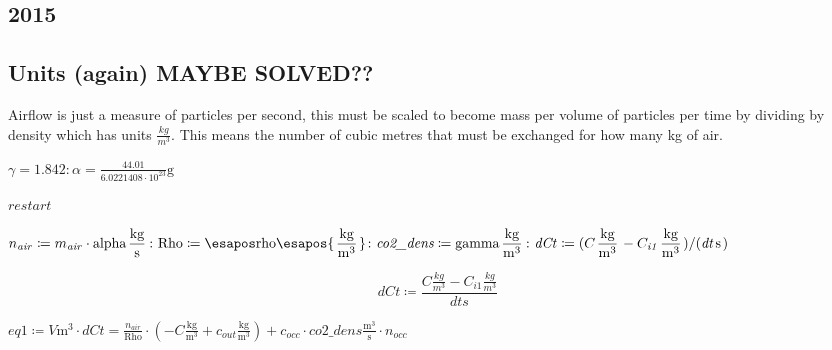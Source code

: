\documentclass{article}
\begin{document}
\subsection{\textbf{2015}}
\subsection{\textbf{Units (again) MAYBE SOLVED??}}
\begin{Maple Normal}
Airflow is just a measure of particles per second, this must be scaled to become mass per volume of particles per time by dividing by density which has units 
{$ \frac{\mathit{kg}}{m^{3}}. $} This means the number of cubic metres that must be exchanged for how many kg of air. 
\end{Maple Normal}
\begin{Maple Normal}
{$ \displaystyle \gamma = 1.842\colon \alpha =\frac{ 44.01}{ 6.0221408\cdot 10^{23}}{\left.\mathrm{g}\right.} $}
\end{Maple Normal}
\begin{Maple Normal}
{$ \displaystyle \mathit{restart}  $}
\end{Maple Normal}
\begin{Maple Normal}
{$ \displaystyle n_{\mathit{air}}\coloneqq m_{\mathit{air}}\cdot \mathrm{alpha}{\left.\frac{\mathrm{kg}}{\mathrm{s}}\right.}\colon \mathrm{Rho}\coloneqq \esapos \mathrm{rho}\esapos {\left.\frac{\mathrm{kg}}{\mathrm{m}^{3}}\right.}\colon \textit{co2\_dens} \coloneqq \mathrm{gamma}{\left.\frac{\mathrm{kg}}{\mathrm{m}^{3}}\right.}\colon \mathit{dCt} \coloneqq (C {\left.\frac{\mathrm{kg}}{\mathrm{m}^{3}}\right.}-C_{\mathit{i1}}{\left.\frac{\mathrm{kg}}{\mathrm{m}^{3}}\right.})/(\mathit{dt} {\left.\mathrm{s}\right.}) $}
\end{Maple Normal}
\begin{dmath}\label{(1.2.1)}
\mathit{dCt} \coloneqq \frac{C {\left.\frac{\mathit{kg}}{m^{3}}\right.}-C_{\mathit{i1}} {\left.\frac{\mathit{kg}}{m^{3}}\right.}}{\mathit{dt} {\left.s \right.}}
\end{dmath}
\begin{Maple Normal}
{$ \displaystyle \mathit{eq1} \coloneqq V {\left.\mathrm{m}^{3}\right.}\cdot \mathit{dCt} =\frac{n_{\mathit{air}}}{\mathrm{Rho}}\cdot (-C {\left.\frac{\mathrm{kg}}{\mathrm{m}^{3}}\right.}+c_{\mathit{out}}{\left.\frac{\mathrm{kg}}{\mathrm{m}^{3}}\right.})+c_{\mathit{occ}}\cdot \textit{co2\_dens} {\left.\frac{\mathrm{m}^{3}}{\mathrm{s}}\right.}\cdot n_{\mathit{occ}} $}
\end{Maple Normal}
\end{document}
